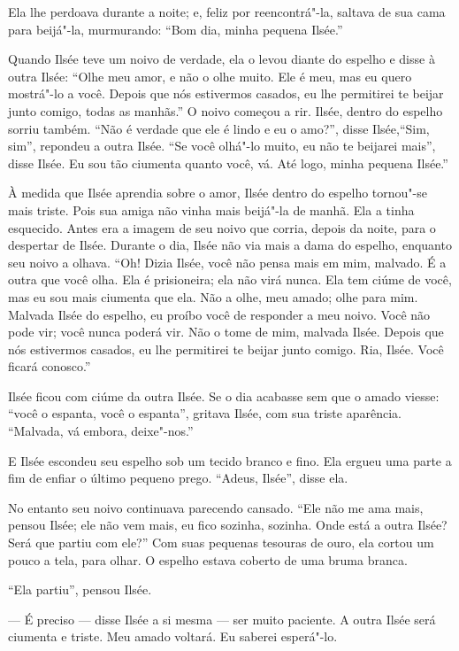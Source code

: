 Ela lhe perdoava durante a noite; e, feliz por reencontrá"-la,
saltava de sua cama para beijá"-la, murmurando: “Bom dia, minha pequena
Ilsée.”

Quando Ilsée teve um noivo de verdade, ela o levou diante do espelho e
disse à outra Ilsée: “Olhe meu amor, e não o olhe muito. Ele é meu, mas eu
quero mostrá"-lo a você. Depois que nós estivermos casados, eu lhe
permitirei te beijar junto comigo, todas as manhãs.” O noivo começou a
rir. Ilsée, dentro do espelho sorriu também. “Não é verdade que ele é 
lindo e eu o amo?”, disse Ilsée,``Sim, sim”, repondeu a outra Ilsée.
“Se você olhá"-lo muito, eu não te beijarei mais'', disse Ilsée. Eu sou 
tão ciumenta quanto você, vá. Até logo, minha pequena Ilsée.”

À medida que Ilsée aprendia sobre o amor, Ilsée dentro do espelho
tornou"-se mais triste. Pois sua amiga não vinha mais beijá"-la de manhã.
Ela a tinha esquecido. Antes era a imagem de seu noivo que corria,
depois da noite, para o despertar de Ilsée. Durante o dia, Ilsée não via
mais a dama do espelho, enquanto seu noivo a olhava. “Oh! Dizia Ilsée,
você não pensa mais em mim, malvado. É a outra que você olha. Ela é
prisioneira; ela não virá nunca. Ela tem ciúme de você, mas eu sou mais
ciumenta que ela. Não a olhe, meu amado; olhe para mim. Malvada Ilsée do
espelho, eu proíbo você de responder a meu noivo. Você não pode vir; você
nunca poderá vir. Não o tome de mim, malvada Ilsée. Depois que nós
estivermos casados, eu lhe permitirei te beijar junto comigo. Ria, Ilsée.
Você ficará conosco.”

Ilsée ficou com ciúme da outra Ilsée. Se o dia acabasse sem que o amado
viesse: ``você o espanta, você o espanta'', gritava Ilsée, com sua triste
aparência. ``Malvada, vá embora, deixe"-nos.''

E Ilsée escondeu seu espelho sob um tecido branco e fino. Ela ergueu
uma parte a fim de enfiar o último pequeno prego. “Adeus, Ilsée”, disse
ela.

No entanto seu noivo continuava parecendo cansado. “Ele não me ama
mais, pensou Ilsée; ele não vem mais, eu fico sozinha, sozinha. Onde está
a outra Ilsée? Será que partiu com ele?” Com suas pequenas tesouras de ouro,
ela cortou um pouco a tela, para olhar. O espelho estava coberto de uma
bruma branca.

“Ela partiu”, pensou Ilsée.

--- É preciso --- disse Ilsée a si mesma --- ser muito paciente. A outra Ilsée será
ciumenta e triste. Meu amado voltará. Eu saberei esperá"-lo.

